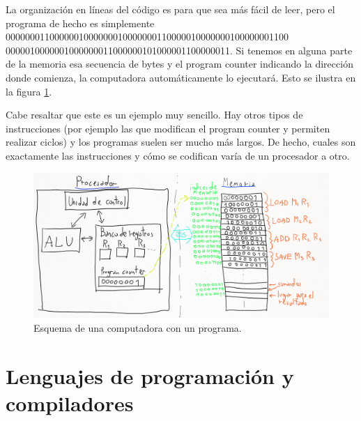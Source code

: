 \documentclass[a4paper, 12pt]{report}
\theoremstyle{definition}
\begin{document}
La organización en líneas del código es para que sea más fácil de leer, pero el programa de hecho es simplemente 0000000110000001000000010000000110000010000000100000001100 0000010000001000000011000000101000001100000011. Si tenemos en alguna parte de la memoria esa secuencia de bytes y el program counter indicando la dirección donde comienza, la computadora automáticamente lo ejecutará. Esto se ilustra en la figura \ref{fig-ArqVNEjProg}.

Cabe resaltar que este es un ejemplo muy sencillo. Hay otros tipos de instrucciones (por ejemplo las que modifican el program counter y permiten realizar ciclos) y los programas suelen ser mucho más largos. De hecho, cuales son exactamente las instrucciones y cómo se codifican varía de un procesador a otro.

\begin{figure}
	\centering
	\includegraphics[scale=0.33]{ArqVNEjProg.png}
	\caption{Esquema de una computadora con un programa.}
	\label{fig-ArqVNEjProg}
\end{figure}

\section{Lenguajes de programación y compiladores}
\end{document}
